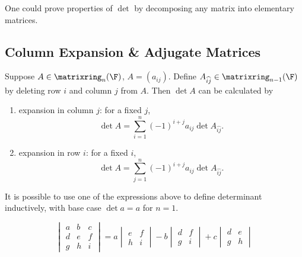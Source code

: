 \documentclass[a4paper]{article}
\newcommand*{\M}{\matrixring}
\theoremstyle{definition}
\begin{document}
One could prove properties of \(\det\) by decomposing any matrix into elementary matrices.

\subsection{Column Expansion \& Adjugate Matrices}

\begin{lemma}
  Suppose \(A \in \M_n(\F)\), \(A = (a_{ij})\). Define \(A_{\widehat{ij}} \in \M_{n - 1}(\F)\) by deleting row \(i\) and column \(j\) from \(A\). Then \(\det A\) can be calculated by
  \begin{enumerate}
  \item expansion in column \(j\): for a fixed \(j\),
    \[
      \det A = \sum_{i = 1}^{n} (-1)^{i + j} a_{ij} \det A_{\widehat{ij}}.
    \]
  \item expansion in row \(i\): for a fixed \(i\),
    \[
      \det A = \sum_{j = 1}^{n} (-1)^{i + j} a_{ij} \det A_{\widehat{ij}}.
    \]
  \end{enumerate}
\end{lemma}

\begin{remark}
  It is possible to use one of the expressions above to define determinant inductively, with base case \(\det a = a\) for \(n = 1\).
\end{remark}

\begin{eg}
  \[
    \begin{vmatrix}
      a & b & c \\
      d & e & f \\
      g & h & i
    \end{vmatrix}
    =
    a
    \begin{vmatrix}
      e & f \\
      h & i
    \end{vmatrix}
    -b
    \begin{vmatrix}
      d & f \\
      g & i
    \end{vmatrix}
    +c
    \begin{vmatrix}
      d & e \\
      g & h
    \end{vmatrix}
  \]
\end{eg}
\end{document}

